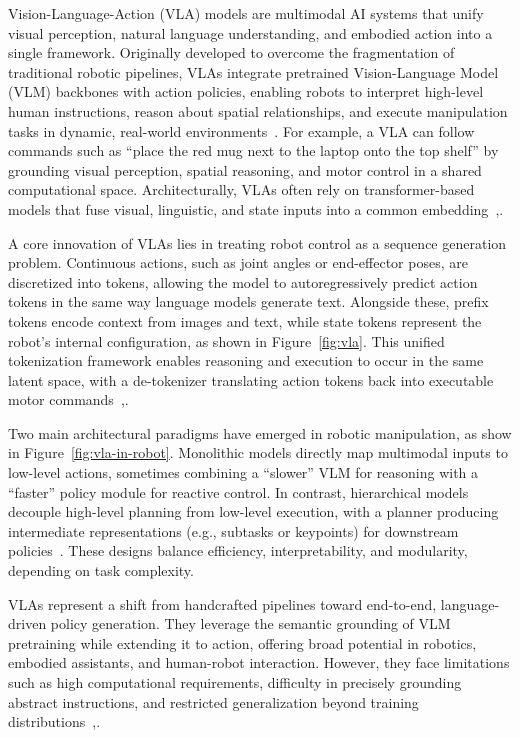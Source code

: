 \documentclass[12pt]{extarticle}
\begin{document}
Vision-Language-Action (VLA) models are multimodal AI systems that unify visual perception, natural language understanding, and embodied action into a single framework. Originally developed to overcome the fragmentation of traditional robotic pipelines, VLAs integrate pretrained Vision-Language Model (VLM) backbones with action policies, enabling robots to interpret high-level human instructions, reason about spatial relationships, and execute manipulation tasks in dynamic, real-world environments~\cite{vla}. For example, a VLA can follow commands such as “place the red mug next to the laptop onto the top shelf” by grounding visual perception, spatial reasoning, and motor control in a shared computational space. Architecturally, VLAs often rely on transformer-based models that fuse visual, linguistic, and state inputs into a common embedding~\cite{vla},\cite{vla-in-robot}.

A core innovation of VLAs lies in treating robot control as a sequence generation problem. Continuous actions, such as joint angles or end-effector poses, are discretized into tokens, allowing the model to autoregressively predict action tokens in the same way language models generate text. Alongside these, prefix tokens encode context from images and text, while state tokens represent the robot’s internal configuration, as shown in Figure~\ref{fig:vla}. This unified tokenization framework enables reasoning and execution to occur in the same latent space, with a de-tokenizer translating action tokens back into executable motor commands~\cite{vla},\cite{vla-in-robot}.

Two main architectural paradigms have emerged in robotic manipulation, as show in Figure~\ref{fig:vla-in-robot}. Monolithic models directly map multimodal inputs to low-level actions, sometimes combining a “slower” VLM for reasoning with a “faster” policy module for reactive control. In contrast, hierarchical models decouple high-level planning from low-level execution, with a planner producing intermediate representations (e.g., subtasks or keypoints) for downstream policies~\cite{vla-in-robot}. These designs balance efficiency, interpretability, and modularity, depending on task complexity.

VLAs represent a shift from handcrafted pipelines toward end-to-end, language-driven policy generation. They leverage the semantic grounding of VLM pretraining while extending it to action, offering broad potential in robotics, embodied assistants, and human-robot interaction. However, they face limitations such as high computational requirements, difficulty in precisely grounding abstract instructions, and restricted generalization beyond training distributions~\cite{vla},\cite{vla-in-robot}.
\end{document}
